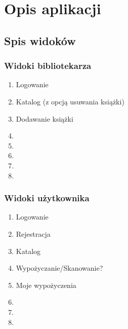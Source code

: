 \documentclass[]{report}
\begin{document}
\section{Opis aplikacji}
\subsection{Spis widoków}
\subsubsection{Widoki bibliotekarza}
	\begin{enumerate}
        \item Logowanie
        \item Katalog (z opcją usuwania książki)
        \item Dodawanie książki
        \item 
        \item 
        \item 
        \item 
        \item 

	\end{enumerate}
\subsubsection{Widoki użytkownika}
	\begin{enumerate}
		\item Logowanie
        \item Rejestracja
        \item Katalog
        \item Wypożyczanie/Skanowanie?
        \item Moje wypożyczenia
        \item 
        \item 
        \item 
	\end{enumerate}

\begin{comment}
Amazing image Fig. \ref{fig:sneak}:
\begin{figure}[H]
	\centering
	\texttt{[image: Figures/SampleImage.png]}
	\caption{Check me - I am caption!}
	\label{fig:sneak}
\end{figure}

\begin{figure}[H]
	\centering
	\texttt{[image: Figures/SampleImage.png]}
	\texttt{[image: Figures/SampleImage.png]}\\
	\vspace{1cm}
	\texttt{[image: Figures/SampleImage.png]}\\
	\caption{Check me - I am caption of many images!}
	\label{fig:snea2k}
\end{figure}
\end{comment}
\end{document}
